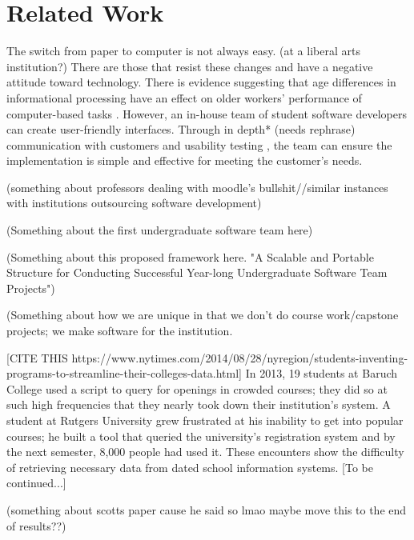 \section{Related Work}

The switch from paper to computer is not always easy. (at a liberal arts institution?) There are those that resist these changes and have a negative attitude toward technology. There is evidence suggesting that age differences in informational processing have an effect on older workers' performance of computer-based tasks \cite{oldpeopleandtech}. 
However, an in-house team of student software developers can create user-friendly interfaces. Through in depth* (needs rephrase) communication with customers and usability testing \cite{usabilitytesting}, the team can ensure the implementation is simple and effective for meeting the customer's needs.

(something about professors dealing with moodle's bullshit//similar instances with institutions outsourcing software development)

(Something about the first undergraduate software team here)\cite{rochesterfirstundergradsoftwareteam}

(Something about this proposed framework here. "A Scalable and Portable Structure for Conducting Successful Year-long Undergraduate Software Team Projects") \cite{yearlong}

(Something about how we are unique in that we don't do course work/capstone projects; we make software for the institution.

[CITE THIS https://www.nytimes.com/2014/08/28/nyregion/students-inventing-programs-to-streamline-their-colleges-data.html] 
In 2013, 19 students at Baruch College used a script to query for openings in crowded courses; they did so at such high frequencies that they nearly took down their institution's system. A student at Rutgers University grew frustrated at his inability to get into popular courses; he built a tool that queried the university's registration system and by the next semester, 8,000 people had used it. These encounters show the difficulty of retrieving necessary data from dated school information systems. 
[To be continued...]


(something about scotts paper cause he said so lmao maybe move this to the end of results??) \cite{heggen2018hiring}
